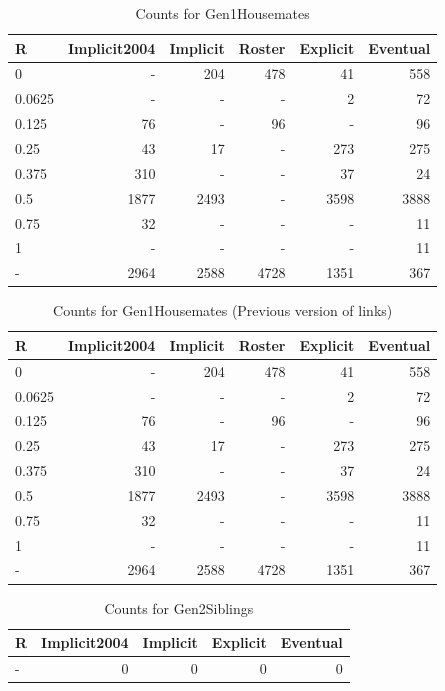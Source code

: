 \documentclass[a4paper]{article}\usepackage[]{graphicx}\usepackage[]{color}
\begin{document}
\begin{table}[ht]
\centering
{\large
\begin{tabular}{lrrrrr}
  \hline
R & Implicit2004 & Implicit & Roster & Explicit & Eventual \\ 
  \hline
0 & - & 204 & 478 &  41 & 558 \\ 
  0.0625 & - & - & - &   2 &  72 \\ 
  0.125 &  76 & - &  96 & - &  96 \\ 
  0.25 &  43 &  17 & - & 273 & 275 \\ 
  0.375 & 310 & - & - &  37 &  24 \\ 
  0.5 & 1877 & 2493 & - & 3598 & 3888 \\ 
  0.75 &  32 & - & - & - &  11 \\ 
  1 & - & - & - & - &  11 \\ 
  - & 2964 & 2588 & 4728 & 1351 & 367 \\ 
   \hline
\end{tabular}
}
\caption{Counts for Gen1Housemates} 
\end{table}
\begin{table}[ht]
\centering
{\large
\begin{tabular}{lrrrrr}
  \hline
R & Implicit2004 & Implicit & Roster & Explicit & Eventual \\ 
  \hline
0 & - & 204 & 478 &  41 & 558 \\ 
  0.0625 & - & - & - &   2 &  72 \\ 
  0.125 &  76 & - &  96 & - &  96 \\ 
  0.25 &  43 &  17 & - & 273 & 275 \\ 
  0.375 & 310 & - & - &  37 &  24 \\ 
  0.5 & 1877 & 2493 & - & 3598 & 3888 \\ 
  0.75 &  32 & - & - & - &  11 \\ 
  1 & - & - & - & - &  11 \\ 
  - & 2964 & 2588 & 4728 & 1351 & 367 \\ 
   \hline
\end{tabular}
}
\caption{Counts for Gen1Housemates (Previous version of links)} 
\end{table}
\begin{table}[ht]
\centering
{\large
\begin{tabular}{lrrrr}
  \hline
R & Implicit2004 & Implicit & Explicit & Eventual \\ 
  \hline
- &   0 &   0 &   0 &   0 \\ 
   \hline
\end{tabular}
}
\caption{Counts for Gen2Siblings} 
\end{table}
\end{document}
